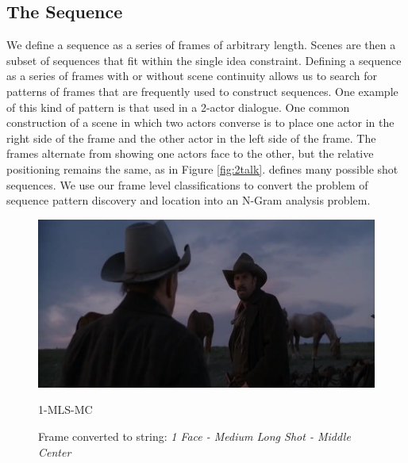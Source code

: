 \subsection{The Sequence}
We define a sequence as a series of frames of arbitrary length. Scenes are then a subset of sequences that fit within the single idea constraint. Defining a sequence as a series of frames with or without scene continuity allows us to search for patterns of frames that are frequently used to construct sequences. One example of this kind of pattern is that used in a 2-actor dialogue. One common construction of a scene in which two actors converse is to place one actor in the right side of the frame and the other actor in the left side of the frame. The frames alternate from showing one actors face to the other, but the relative positioning remains the same, as in Figure \ref{fig:2talk}. \cite{arijon_grammar_1991} defines many possible shot sequences. We use our frame level classifications to convert the problem of sequence pattern discovery and location into an N-Gram analysis problem.


\begin{figure}
\begin{center}
\includegraphics[width=0.98\linewidth]
    {fig/classes/1-MLS-MC.jpg}

\large{1-MLS-MC}
\caption{Frame converted to string: \textit{1 Face - Medium Long Shot - Middle Center}}
\end{center}
\label{fig:tagExample1}
\end{figure}


